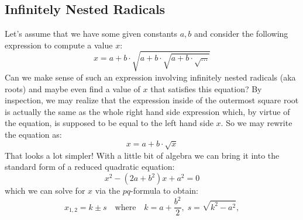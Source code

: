 \subsection{Infinitely Nested Radicals}
Let's assume that we have some given constants $a,b$ and consider the following expression to compute a value $x$:
\begin{equation}
 x = a + b \cdot \sqrt{a + b \cdot \sqrt{a + b \cdot \sqrt{\ldots}}}
\end{equation}
Can we make sense of such an expression involving infinitely nested radicals (aka roots) and maybe even find a value of $x$ that satisfies this equation? By inspection, we may realize that the expression inside of the outermost square root is actually the same as the whole right hand side expression which, by virtue of the equation, is supposed to be equal to the left hand side $x$. So we may rewrite the equation as:
\begin{equation}
 x = a + b \cdot \sqrt{x}
\end{equation}
That looks a lot simpler! With a little bit of algebra we can bring it into the standard form of a reduced quadratic equation:
\begin{equation}
x^2 - (2a + b^2) x + a^2 = 0
\end{equation}
which we can solve for $x$ via the $pq$-formula to obtain:
\begin{equation}
x_{1,2} = k \pm s 
\quad \text{where} \quad
k = a + \frac{b^2}{2}, \;
s = \sqrt{k^2 - a^2}, 
\end{equation}
